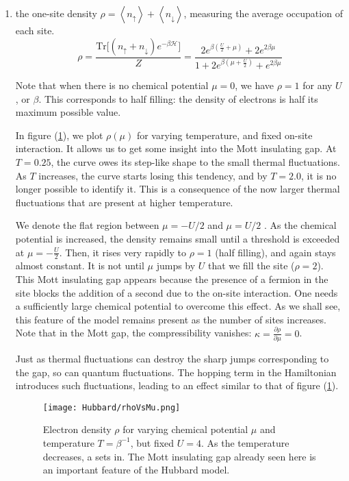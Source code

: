 \begin{enumerate}
\item the one-site density $\rho = \left\langle n_\uparrow \right\rangle + \left\langle n_\downarrow \right\rangle$, measuring the average occupation of each site.
\begin{equation}
\rho = \frac{\text{Tr} \big[ (n_\uparrow + n_\downarrow ) e^{-\beta\mathcal{H}} \big]}{Z} = \frac{2 e^{\beta(\frac{U}{2} + \mu)} + 2 e^{2\beta\mu}}{1 + 2 e^{\beta(\mu + \frac{U}{2})} + e^{2 \beta \mu}}
\end{equation}

Note that when there is no chemical potential $\mu = 0$, we have $\rho = 1$ for any $U$, or $\beta$.
This corresponds to half filling: the density of electrons is half its maximum possible value.

In figure (\ref{fig:rhoVsMu}), we plot $\rho(\mu)$ for varying temperature, and fixed on-site interaction.
It allows us to get some insight into the Mott insulating gap.
At $T = 0.25$, the curve owes its step-like shape to the small thermal fluctuations.
As $T$ increases, the curve starts losing this tendency, and by $T = 2.0$, it is no longer possible to identify it.
This is a consequence of the now larger thermal fluctuations that are present at higher temperature.

We denote the flat region between $\mu = - U / 2 $ and $\mu =  U / 2 $  .
As the chemical potential is increased, the density remains small until a threshold is exceeded at $\mu = - \frac{U}{2}$. 
Then, it rises very rapidly to $\rho = 1$ (half filling), and again stays almost constant.
It is not until $\mu$ jumps by $U$ that we fill the site ($\rho = 2$).
This Mott insulating gap appears because the presence of a fermion in the site blocks the addition of a second due to the on-site interaction.
One needs a sufficiently large chemical potential to overcome this effect.
As we shall see, this feature of the model remains present as the number of sites increases.
Note that in the Mott gap, the compressibility vanishes: $\kappa = \frac{\partial \rho}{\partial \mu} = 0$.

Just as thermal fluctuations can destroy the sharp jumps corresponding to the gap, so can quantum fluctuations.
The hopping term in the Hamiltonian introduces such fluctuations, leading to an effect similar to that of figure (\ref{fig:rhoVsMu}).

\begin{figure}[H]
	\centering
\hspace{12mm}\texttt{[image: Hubbard/rhoVsMu.png]}
	\caption[Electron density in the purely atomic limit of the Hubbard model]{Electron density $\rho$ for varying chemical potential $\mu$ and temperature $T = \beta^{-1}$, but fixed $U = 4$. As the temperature decreases, a  sets in. The Mott insulating gap already seen here is an important feature of the Hubbard model.}
	\label{fig:rhoVsMu}
\end{figure}


\end{enumerate}
